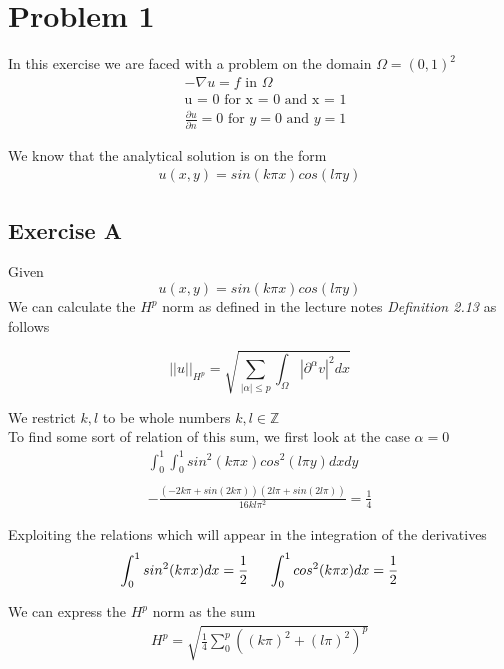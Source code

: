 \documentclass[a4paper,norsk]{article}
\begin{document}
\maketitle

\section*{Problem 1}

In this exercise we are faced with a problem on the domain $\Omega = (0,1)^2$
\begin{align}
&-\nabla u = f\text{ in } \Omega \\
&\text{u = 0 for x = 0 and x = 1} \\
&\frac{\partial u}{\partial n} = 0 \text{ for } y = 0 \text{ and } y = 1
\end{align}

We know that the analytical solution is on the form
\begin{align*}
u(x,y) = sin(k \pi x) cos(l \pi y)
\end{align*}

\subsection*{Exercise A}
Given \[ u(x,y) = sin(k \pi x)cos(l \pi y) \] We can calculate the $H^p$ norm as defined
in the lecture notes \textit{Definition 2.13} as follows

\[||u||_{H^p} = \sqrt{ \sum_{|\alpha| \leq p} \int_\Omega |\partial^{\alpha} v|^2 dx }   \]

We restrict $k,l$ to be whole numbers $k,l \in \mathbb{Z} $ \\
To find some sort of relation of this sum, we first look at the case $\alpha = 0$
\begin{align*}
\int_0^1 \int_0^1 sin^2(k \pi x) cos^2(l \pi y) dx dy  \\ \\
-\frac{(-2k\pi + sin(2 k \pi))(2 l \pi + sin(2 l \pi))  }{16 k l \pi^2}   = \frac{1}{4}
\end{align*}

Exploiting the relations which will appear in the integration of the derivatives
\begin{align*}
\int_0^1 sin^2(k \pi x) dx = \frac{1}{2} \hspace{5mm} \int_0^1 cos^2(k \pi x) dx = \frac{1}{2}
\end{align*}

We can express the $H^p$ norm as the sum
\begin{align*}
H^p = \sqrt{\frac{1}{4} \sum_0^p ((k \pi)^2 + (l \pi)^2 )^p  }
\end{align*}
\end{document}
